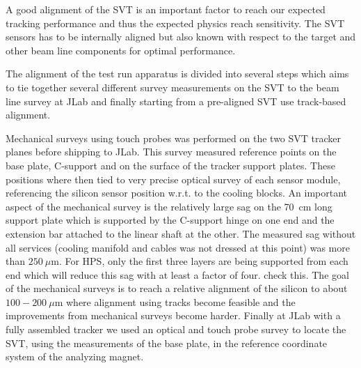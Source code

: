 A good alignment of the SVT is an important factor to reach our expected tracking performance 
and thus the expected physics reach sensitivity. The SVT sensors has to be internally aligned but 
also known with respect to the target and other beam line components for optimal performance. 

The alignment of the test run apparatus is divided into several steps which aims to tie together 
several different survey measurements on the SVT to the beam line survey at JLab and finally 
starting from a pre-aligned SVT use track-based alignment. 

Mechanical surveys using touch probes was performed on the two SVT tracker planes before 
shipping to JLab. This survey measured reference points on the base plate, C-support and on the surface of the tracker support plates. These positions where then tied to very precise optical 
survey of each sensor module, referencing the silicon sensor position w.r.t. to the cooling blocks. 
An important aspect of the mechanical survey is the relatively large sag on 
the 70~cm long support plate which is supported by the C-support hinge on one end and the 
extension bar attached to the linear shaft at the other. The measured sag without all services 
(cooling manifold and cables was not dressed at this point) was more than $250~\mu$m.  
For HPS, only the first three layers are being supported from each end which will reduce this 
sag with at least a factor of four. {\color{red} check this}. The goal of the mechanical surveys is to reach a relative alignment of the 
silicon to about $100-200~\mu$m where alignment using tracks become feasible and the 
improvements from mechanical surveys become harder. Finally at JLab with a fully assembled 
tracker we used an optical and touch probe survey to locate 
the SVT, using the measurements of the base plate, in the reference coordinate system of 
the analyzing magnet. 

